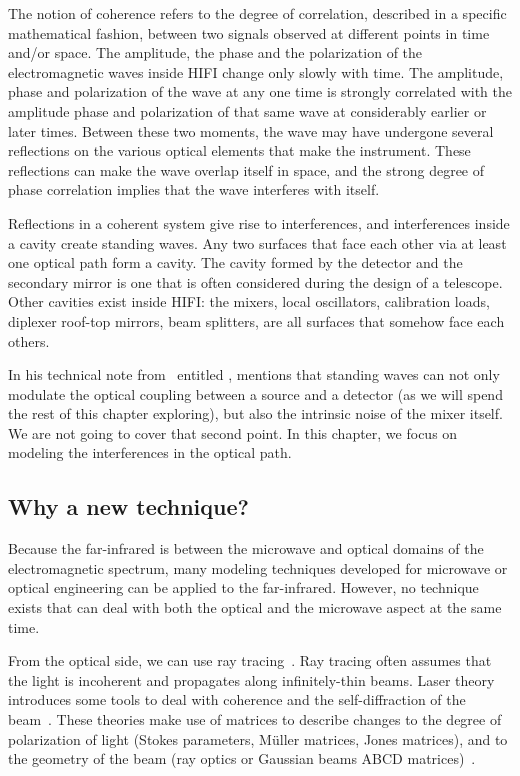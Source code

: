 The notion of coherence refers to the degree of correlation, described in a specific mathematical fashion, between two signals observed at different points in time and/or space.
The amplitude, the phase and the polarization of the electromagnetic waves inside HIFI change only slowly with time.
The amplitude, phase and polarization of the wave at any one time is strongly correlated with the amplitude phase and polarization of that same wave at considerably earlier or later times.
Between these two moments, the wave may have undergone several reflections on the various optical elements that make the instrument.
These reflections can make the wave overlap itself in space, and the strong degree of phase correlation implies that the wave interferes with itself.

Reflections in a coherent system give rise to interferences, and interferences inside a cavity create standing waves.
Any two surfaces that face each other via at least one optical path form a cavity.
The cavity formed by the detector and the secondary mirror is one that is often considered during the design of a telescope.
Other cavities exist inside HIFI: the mixers, local oscillators, calibration loads, diplexer roof-top mirrors, beam splitters, are all surfaces that somehow face each others.

In his technical note from~ entitled
,
\citeauthor{whyborn2002standingwaves} mentions that standing waves can not only modulate the optical coupling between a source and a detector (as we will spend the rest of this chapter exploring), but also the intrinsic noise of the mixer itself.
We are not going to cover that second point.
In this chapter, we focus on modeling the interferences in the optical path.

\subsection{Why a new technique?}
Because the far-infrared is between the microwave and optical domains of the electromagnetic spectrum, many modeling techniques developed for microwave or optical engineering can be applied to the far-infrared.
However, no technique exists that can deal with both the optical and the microwave aspect at the same time.

From the optical side, we can use ray tracing~\cite{spencer1962general}.
Ray tracing often assumes that the light is incoherent and propagates along infinitely-thin beams.
Laser theory introduces some tools to deal with coherence and the self-diffraction of the beam~\cite{siegman1986lasers}.
These theories make use of matrices to describe changes to the degree of polarization of light (Stokes parameters, Müller matrices, Jones matrices), and to the geometry of the beam (ray optics or Gaussian beams ABCD matrices)~\cite{goldsmith1998quasioptical}.

